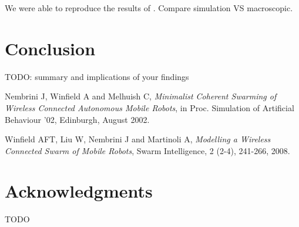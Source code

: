 \documentclass[a4paper, 10pt, conference]{ieeeconf}
\begin{document}
  We were able to reproduce the results of \cite{Winfield08}. Compare simulation VS macroscopic.


\section{Conclusion}
  TODO: summary and implications of your findings




\begin{thebibliography}{99}

   Nembrini J, Winfield A and Melhuish C, \textit{Minimalist Coherent Swarming of Wireless Connected Autonomous Mobile Robots}, in Proc. Simulation of Artificial Behaviour '02, Edinburgh, August 2002.

   Winfield AFT, Liu W, Nembrini J and Martinoli A, \textit{Modelling a Wireless Connected Swarm of Mobile Robots}, Swarm Intelligence, 2 (2-4), 241-266, 2008.

\end{thebibliography}

\section*{Acknowledgments}
  TODO
\end{document}
